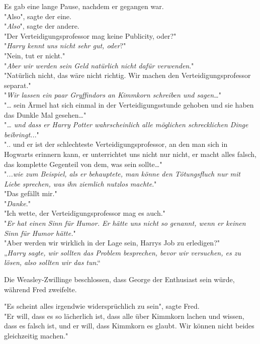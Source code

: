 {Es gab eine lange Pause, nachdem er gegangen war.\\ "Also", sagte der eine.\\ "\emph{Also}", sagte der andere.\\ "Der Verteidigungsprofessor mag keine Publicity, oder?"\\ "\emph{Harry kennt uns nicht sehr gut, oder}?"\\ "Nein, tut er nicht."\\ "\emph{Aber wir werden sein Geld natürlich nicht dafür verwenden}."\\ "Natürlich nicht, das wäre nicht richtig. Wir machen den Verteidigungsprofessor separat."\\ "\emph{Wir lassen ein paar Gryffindors an Kimmkorn schreiben und sagen…}"\\ "… sein Ärmel hat sich einmal in der Verteidigungsstunde gehoben und sie haben das Dunkle Mal gesehen…"\\ "\emph{… und dass er Harry Potter wahrscheinlich alle möglichen schrecklichen Dinge} \emph{beibringt..}."\\ ".. und er ist der schlechteste Verteidigungsprofessor, an den man sich in Hogwarts erinnern kann, er unterrichtet uns nicht nur nicht, er macht alles falsch, das komplette Gegenteil von dem, was sein sollte…"\\ ".\emph{..wie zum Beispiel, als er behauptete, man könne den Tötungsfluch nur mit Liebe sprechen, was ihn ziemlich nutzlos machte}."\\ "Das gefällt mir."\\ "\emph{Danke}."\\ "Ich wette, der Verteidigungsprofessor mag es auch."\\ "\emph{Er hat einen Sinn für Humor. Er hätte uns nicht so genannt, wenn er keinen Sinn für Humor hätte.}"\\ "Aber werden wir wirklich in der Lage sein, Harrys Job zu erledigen?"\\ „\emph{Harry sagte, wir sollten das Problem besprechen, bevor wir versuchen, es zu lösen, also sollten wir das tun}.“

Die Weasley-Zwillinge beschlossen, dass George der Enthusiast sein würde, während Fred zweifelte.

"Es scheint alles irgendwie widersprüchlich zu sein", sagte Fred.\\ "Er will, dass es so lächerlich ist, dass alle über Kimmkorn lachen und wissen, dass es falsch ist, und er will, dass Kimmkorn es glaubt. Wir können nicht beides gleichzeitig machen."

}
